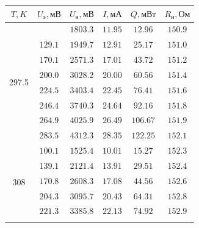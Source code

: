 \documentclass[a4paper,12pt]{article}
\begin{document}
\begin{tabular}{|c|c|c|c|c|c|}
  \hline $T, K$ & $U_\text{э}, \text{мВ}$ & $U_{\text{н}}, \text{мВ}$ & $I, \text{мА}$ & $Q, \text{мВт}$ & $R_{\text{н}}, \text{Ом}$ \\\hline
  \multirow{8}{*}{297.5}
                & $ $                     & $1803.3$                  & $11.95$        & $12.96$         & $150.9$                   \\\cline{2-6}
                & $129.1$                 & $1949.7$                  & $12.91$        & $25.17$         & $151.0$                   \\\cline{2-6}
                & $170.1$                 & $2571.3$                  & $17.01$        & $43.72$         & $151.2$                   \\\cline{2-6}
                & $200.0$                 & $3028.2$                  & $20.00$        & $60.56$         & $151.4$                   \\\cline{2-6}
                & $224.5$                 & $3403.4$                  & $22.45$        & $76.41$         & $151.6$                   \\\cline{2-6}
                & $246.4$                 & $3740.3$                  & $24.64$        & $92.16$         & $151.8$                   \\\cline{2-6}
                & $264.9$                 & $4025.9$                  & $26.49$        & $106.67$        & $151.9$                   \\\cline{2-6}
                & $283.5$                 & $4312.3$                  & $28.35$        & $122.25$        & $152.1$                   \\\hline
  \multirow{8}{*}{308}
                & $100.1$                 & $1525.4$                  & $10.01$        & $15.27$         & $152.3$                   \\\cline{2-6}
                & $139.1$                 & $2121.4$                  & $13.91$        & $29.51$         & $152.4$                   \\\cline{2-6}
                & $170.8$                 & $2608.3$                  & $17.08$        & $44.56$         & $152.6$                   \\\cline{2-6}
                & $204.3$                 & $3095.7$                  & $20.43$        & $64.31$         & $152.8$                   \\\cline{2-6}
                & $221.3$                 & $3385.8$                  & $22.13$        & $74.92$         & $152.9$                   \\\cline{2-6}

\end{tabular}
\end{document}
